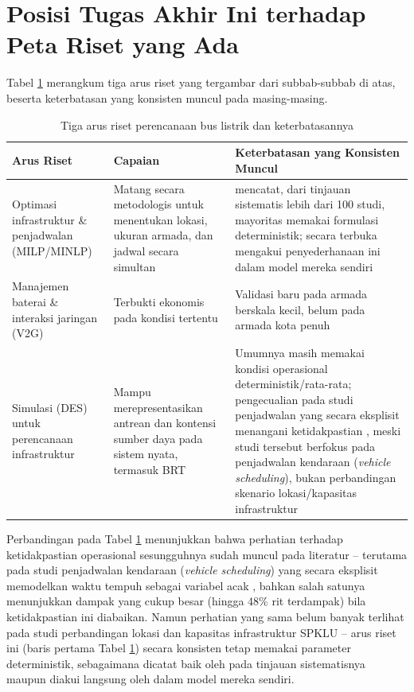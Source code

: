 \section{Posisi Tugas Akhir Ini terhadap Peta Riset yang Ada}
\label{sec:posisi-penelitian}

Tabel \ref{tab:peta-riset} merangkum tiga arus riset yang tergambar dari
subbab-subbab di atas, beserta keterbatasan yang konsisten muncul pada
masing-masing.

\begin{table}[h]
	\centering
	\caption{Tiga arus riset perencanaan bus listrik dan keterbatasannya}
	\label{tab:peta-riset}
	\begin{tabular}{p{3.5cm}p{4.5cm}p{4.5cm}}
		\toprule
		\textbf{Arus Riset} & \textbf{Capaian} & \textbf{Keterbatasan yang Konsisten Muncul} \\
		\midrule
		Optimasi infrastruktur \& penjadwalan (MILP/MINLP) &
		Matang secara metodologis untuk menentukan lokasi, ukuran armada, dan
		jadwal secara simultan \autocite{he2023,rizopoulos2025,guschinsky2021,liu2021} &
		\textcite{zhou2024} mencatat, dari tinjauan sistematis
		lebih dari 100 studi, mayoritas memakai formulasi deterministik;
		\textcite{guschinsky2021} secara terbuka mengakui
		penyederhanaan ini dalam model mereka sendiri \\
		\addlinespace
		Manajemen baterai \& interaksi jaringan (V2G) &
		Terbukti ekonomis pada kondisi tertentu \autocite{manzolli2022} &
		Validasi baru pada armada berskala kecil, belum pada armada kota
		penuh \\
		\addlinespace
		Simulasi (DES) untuk perencanaan infrastruktur &
		Mampu merepresentasikan antrean dan kontensi sumber daya pada sistem
		nyata, termasuk BRT \autocite{jefferiesgohlich2020,sebastiani2016,rios2014,casella2024} &
		Umumnya masih memakai kondisi operasional deterministik/rata-rata;
		pengecualian pada studi penjadwalan yang secara eksplisit menangani
		ketidakpastian \autocite{avishan2023,jiang2021,debruin2023}, meski
		studi tersebut berfokus pada penjadwalan kendaraan (\textit{vehicle
			scheduling}), bukan perbandingan skenario lokasi/kapasitas
		infrastruktur \\
		\bottomrule
	\end{tabular}
\end{table}

Perbandingan pada Tabel \ref{tab:peta-riset} menunjukkan bahwa perhatian
terhadap ketidakpastian operasional sesungguhnya sudah muncul pada
literatur -- terutama pada studi penjadwalan kendaraan (\textit{vehicle
	scheduling}) yang secara eksplisit memodelkan waktu tempuh sebagai variabel
acak \autocite{avishan2023,jiang2021,debruin2023}, bahkan salah satunya
\autocite{avishan2023} menunjukkan dampak yang cukup besar (hingga 48\% rit
terdampak) bila ketidakpastian ini diabaikan. Namun perhatian yang sama
belum banyak terlihat pada studi perbandingan lokasi dan kapasitas
infrastruktur SPKLU -- arus riset ini (baris pertama Tabel
\ref{tab:peta-riset}) secara konsisten tetap memakai parameter deterministik,
sebagaimana dicatat baik oleh \textcite{zhou2024} pada tinjauan
sistematisnya maupun diakui langsung oleh \textcite{guschinsky2021}
dalam model mereka sendiri.

